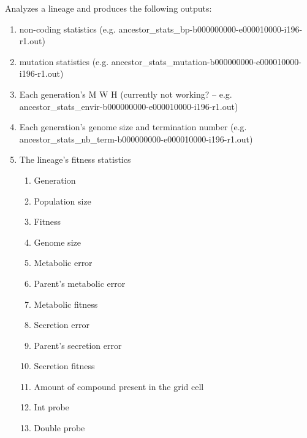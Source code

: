 Analyzes a lineage and produces the following outputs:
\begin{enumerate}
	\item non-coding statistics (e.g. ancestor\_stats\_bp-b000000000-e000010000-i196-r1.out)
	\item mutation statistics (e.g. ancestor\_stats\_mutation-b000000000-e000010000-i196-r1.out)
	\item Each generation’s M W H (currently not working? – e.g. ancestor\_stats\_envir-b000000000-e000010000-i196-r1.out)
	\item Each generation’s genome size and termination number (e.g. ancestor\_stats\_nb\_term-b000000000-e000010000-i196-r1.out)
	\item The lineage’s fitness statistics
	\begin{enumerate}
		\item Generation
		\item Population size
		\item Fitness
		\item Genome size
		\item Metabolic error
		\item Parent’s metabolic error
		\item Metabolic fitness
		\item Secretion error
		\item Parent’s secretion error
		\item Secretion fitness
		\item Amount of compound present in the grid cell
		\item Int probe
		\item Double probe
		

\end{enumerate}
\end{enumerate}
